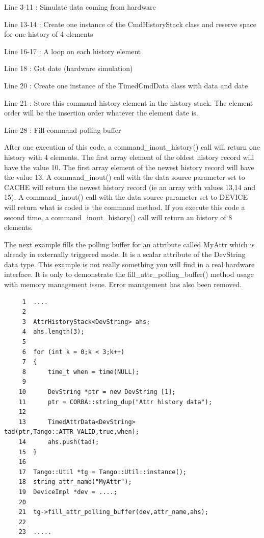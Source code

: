 Line 3-11 : Simulate data coming from hardware

Line 13-14 : Create one instance of the CmdHistoryStack class and
reserve space for one history of 4 elements

Line 16-17 : A loop on each history element

Line 18 : Get date (hardware simulation)

Line 20 : Create one instance of the TimedCmdData class with data
and date

Line 21 : Store this command history element in the history stack.
The element order will be the insertion order whatever the element
date is.

Line 28 : Fill command polling buffer

After one execution of this code, a command\_inout\_history() call
will return one history with 4 elements. The first array element of
the oldest history record will have the value 10. The first array
element of the newest history record will have the value 13. A command\_inout()
call with the data source parameter set to CACHE will return the newest
history record (ie an array with values 13,14 and 15). A command\_inout()
call with the data source parameter set to DEVICE will return what
is coded is the command method. If you execute this code a second
time, a command\_inout\_history() call will return an history of 8
elements.

The next example fills the polling buffer for an attribute called
MyAttr which is already in externally triggered mode. It is a scalar
attribute of the DevString data type. This example is not really something
you will find in a real hardware interface. It is only to demonstrate
the fill\_attr\_polling\_buffer() method usage with memory management
issue. Error management has also been removed.


\begin{verbatim}
     1  ....
     2  
     3  AttrHistoryStack<DevString> ahs;
     4  ahs.length(3);
     5  
     6  for (int k = 0;k < 3;k++)
     7  {
     8      time_t when = time(NULL);
     9  
    10      DevString *ptr = new DevString [1];
    11      ptr = CORBA::string_dup("Attr history data");
    12  
    13      TimedAttrData<DevString> tad(ptr,Tango::ATTR_VALID,true,when);
    14      ahs.push(tad);
    15  }
    16  
    17  Tango::Util *tg = Tango::Util::instance();
    18  string attr_name("MyAttr");
    19  DeviceImpl *dev = ....;
    20  
    21  tg->fill_attr_polling_buffer(dev,attr_name,ahs);
    22  
    23  .....
  
\end{verbatim}


